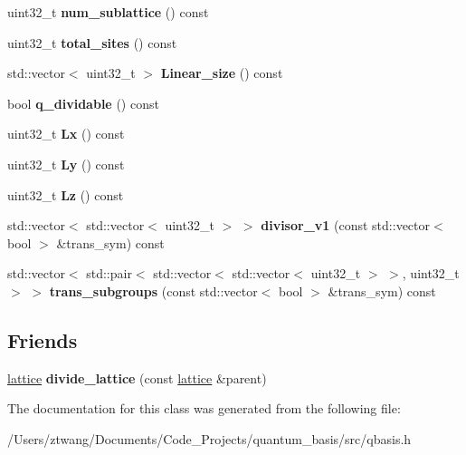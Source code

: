 \begin{DoxyCompactItemize}
uint32\+\_\+t {\bfseries num\+\_\+sublattice} () const
\item 
\mbox{\label{classqbasis_1_1lattice_aec0d584c11778ae81cea51eab0c36f83}} 
uint32\+\_\+t {\bfseries total\+\_\+sites} () const
\item 
\mbox{\label{classqbasis_1_1lattice_ae0c6cdc3a2e19bc9bfc541e61ad266d6}} 
std\+::vector$<$ uint32\+\_\+t $>$ {\bfseries Linear\+\_\+size} () const
\item 
\mbox{\label{classqbasis_1_1lattice_a07bb068b2c2e4f71ee818d367a54f783}} 
bool {\bfseries q\+\_\+dividable} () const
\item 
\mbox{\label{classqbasis_1_1lattice_aaf50768592a49b50fec7ce1d4712d98d}} 
uint32\+\_\+t {\bfseries Lx} () const
\item 
\mbox{\label{classqbasis_1_1lattice_a42571e7a367efdc3de6d39c4102cab24}} 
uint32\+\_\+t {\bfseries Ly} () const
\item 
\mbox{\label{classqbasis_1_1lattice_ad231b7fff0eb9bc057a3eb0684898f05}} 
uint32\+\_\+t {\bfseries Lz} () const
\item 
\mbox{\label{classqbasis_1_1lattice_a5d19df8eb2f05a9407b5e5075ffe5bda}} 
std\+::vector$<$ std\+::vector$<$ uint32\+\_\+t $>$ $>$ {\bfseries divisor\+\_\+v1} (const std\+::vector$<$ bool $>$ \&trans\+\_\+sym) const
\item 
\mbox{\label{classqbasis_1_1lattice_aea1167175a559718fb383c22051a3afc}} 
std\+::vector$<$ std\+::pair$<$ std\+::vector$<$ std\+::vector$<$ uint32\+\_\+t $>$ $>$, uint32\+\_\+t $>$ $>$ {\bfseries trans\+\_\+subgroups} (const std\+::vector$<$ bool $>$ \&trans\+\_\+sym) const
\end{DoxyCompactItemize}
\subsection*{Friends}
\begin{DoxyCompactItemize}
\item 
\mbox{\label{classqbasis_1_1lattice_a0721b4c19fb7b3b987b036fe163dd61d}} 
\hyperlink{classqbasis_1_1lattice}{lattice} {\bfseries divide\+\_\+lattice} (const \hyperlink{classqbasis_1_1lattice}{lattice} \&parent)
\end{DoxyCompactItemize}


The documentation for this class was generated from the following file\+:\begin{DoxyCompactItemize}
\item 
/\+Users/ztwang/\+Documents/\+Code\+\_\+\+Projects/quantum\+\_\+basis/src/qbasis.\+h\end{DoxyCompactItemize}
